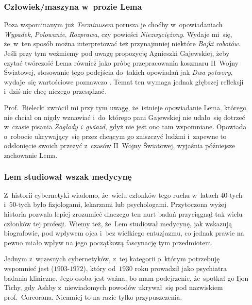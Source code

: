 \documentclass[10pt,t]{beamer}
\begin{document}
\begin{frame}
  \frametitle{Człowiek/maszyna w~prozie Lema}


  Poza wspominanym już \textit{Terminusem} porusza je choćby w~opowiadaniach
  \textit{Wypadek}, \textit{Polowanie}, \textit{Rozprawa}, czy powieści
  \textit{Niezwyciężony}. Wydaje mi~się, że~w~ten sposób można
  interpretować też przynajmniej niektóre \textit{Bajki robotów}. Jeśli
  przy tym weźmiemy pod uwagę propozycję Agnieszki Gajewskiej, żeby czytać
  twórczość Lema również jako próbę przepracowania koszmaru II~Wojny
  Światowej, stosowanie tego podejścia do~takich opowiadań jak
  \textit{Dwa potwory}, wydaje~się wartościowe poznawczo
  \parencite{Gajewska-Zaglada-i-gwiazdy-Pub-2017}. Temat ten wymaga jednak
  głębszej refleksji i~dziś nie chcę niczego przesądzać.

  Prof.~Bielecki zwrócił mi przy tym uwagę, że~istnieje opowiadanie Lema,
  którego nie chciał on nigdy wznawiać i~do~którego pani Gajewskiej
  nie udało~się dotrzeć w~czasie pisania \textit{Zagłady i~gwiazd}, gdyż
  nie jest ono tam wspomniane. Opowiada o~robocie ukrywający~się przez
  chcącym go zniszczyć ludźmi i~zapewne to odsłonięcie swoich przeżyć
  z~czasów II~Wojny Światowej, wyjaśnia późniejsze zachowanie Lema.

\end{frame}





\begin{frame}
  \frametitle{Lem studiował wszak medycynę}


  Z~historii cybernetyki wiadomo, że~wielu członków tego ruchu w~latach
  $40$-tych i~$50$-tych było fizjologami, lekarzami lub psychologami.
  Przytoczona wyżej historia pozwala lepiej zrozumieć dlaczego ten nurt
  badań przyciągnął tak wielu członków tej profesji. Wiemy też, że~Lem
  studiował medycynę, jak wskazują biografowie, pod wpływem ojca i~bez
  wielkiego entuzjazmu, co jednak prawie na pewno miało wpływ na
  jego początkową fascynację tym przedmiotem.

  Jednym z~wczesnych cybernetyków, z~tej kategorii o~którym potrzebuję
  wspomnieć jest
   ($1903\text{-}1972$), który od~$1930$ roku prowadził
  jako psychiatra badania kliniczne. Jego osoba jest ważna, bo mam
  podejrzenie,
  że~spotkał go Ijon Tichy, gdy Ashby z~niewiadomych powodów ukrywał~się
  pod nazwiskiem prof.~Corcorana. Niemniej to na razie tylko przypuszczenia.

\end{frame}
\end{document}
